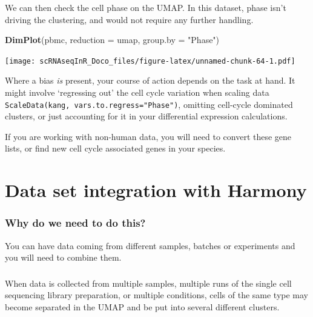 \documentclass[
]{book}
\newenvironment{Shaded}{\begin{snugshade}}{\end{snugshade}}
\newcommand{\AttributeTok}[1]{\textcolor[rgb]{0.13,0.29,0.53}{#1}}
\newcommand{\FunctionTok}[1]{\textcolor[rgb]{0.13,0.29,0.53}{\textbf{#1}}}
\newcommand{\NormalTok}[1]{#1}
\newcommand{\StringTok}[1]{\textcolor[rgb]{0.31,0.60,0.02}{#1}}
\begin{document}
We can then check the cell phase on the UMAP. In this dataset, phase isn't driving the clustering, and would not require any further handling.

\begin{Shaded}
\begin{Highlighting}[]
\FunctionTok{DimPlot}\NormalTok{(pbmc, }\AttributeTok{reduction =} \StringTok{\textquotesingle{}umap\textquotesingle{}}\NormalTok{, }\AttributeTok{group.by =} \StringTok{"Phase"}\NormalTok{)}
\end{Highlighting}
\end{Shaded}

\texttt{[image: scRNAseqInR\_Doco\_files/figure-latex/unnamed-chunk-64-1.pdf]}

Where a bias \emph{is} present, your course of action depends on the task at hand. It might involve `regressing out' the cell cycle variation when scaling data \texttt{ScaleData(kang,\ vars.to.regress="Phase")}, omitting cell-cycle dominated clusters, or just accounting for it in your differential expression calculations.

If you are working with non-human data, you will need to convert these gene lists, or find new cell cycle associated genes in your species.

\hypertarget{Harmony}{%
\chapter{Data set integration with Harmony}\label{Harmony}}

\hypertarget{why-do-we-need-to-do-this-3}{%
\subsection*{Why do we need to do this?}\label{why-do-we-need-to-do-this-3}}

You can have data coming from different samples, batches or experiments and you will need to combine them.

\hypertarget{section-3}{%
\subsection*{}\label{section-3}}

When data is collected from multiple samples, multiple runs of the single cell sequencing library preparation, or multiple conditions, cells of the same type may become separated in the UMAP and be put into several different clusters.
\end{document}
